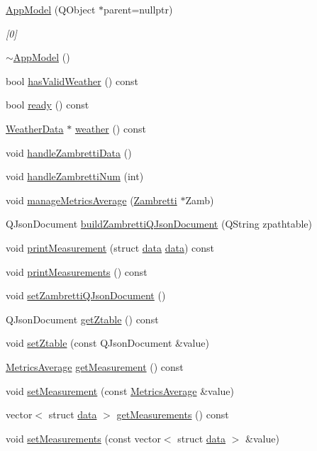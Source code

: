 \begin{DoxyCompactItemize}
\item 
\hyperlink{class_app_model_a14293f7293e1bcbfdb5499789f9e134b}{App\+Model} (Q\+Object $\ast$parent=nullptr)
\begin{DoxyCompactList}\small\item\em \mbox{[}0\mbox{]} \end{DoxyCompactList}\item 
\hyperlink{class_app_model_a67ab3004ccbe2822a8a0abb9fa96ace3}{$\sim$\+App\+Model} ()
\item 
bool \hyperlink{class_app_model_a6ec5b34a1839a7141979709418174ad1}{has\+Valid\+Weather} () const
\item 
bool \hyperlink{class_app_model_a3917fdc3dd8c97715991d9fd1a23abcc}{ready} () const
\item 
\hyperlink{class_weather_data}{Weather\+Data} $\ast$ \hyperlink{class_app_model_a70a5bec8e359e4edbd16611efa96cf32}{weather} () const
\item 
void \hyperlink{class_app_model_a99a784aac19e82ccc6c0dd0509b4ea04}{handle\+Zambretti\+Data} ()
\item 
void \hyperlink{class_app_model_a75d2b6e818885a77f1b1dd56fc3c9cd3}{handle\+Zambretti\+Num} (int)
\item 
void \hyperlink{class_app_model_a91f558862aad6b2509f03e49b549270e}{manage\+Metrics\+Average} (\hyperlink{class_zambretti}{Zambretti} $\ast$Zamb)
\item 
Q\+Json\+Document \hyperlink{class_app_model_a2e738230cd01012b529adadc3f7c4eae}{build\+Zambretti\+Q\+Json\+Document} (Q\+String zpathtable)
\item 
void \hyperlink{class_app_model_a2bb0474a4f5f73ca23f9f72c97912192}{print\+Measurement} (struct \hyperlink{structdata}{data} \hyperlink{structdata}{data}) const
\item 
void \hyperlink{class_app_model_ac60073d6c96f7471f7227be130033399}{print\+Measurements} () const
\item 
void \hyperlink{class_app_model_a18bdf8b2328b6d64e2315b5e8027f07e}{set\+Zambretti\+Q\+Json\+Document} ()
\item 
Q\+Json\+Document \hyperlink{class_app_model_a1e221ad7947cc08e85078416afc5a593}{get\+Ztable} () const
\item 
void \hyperlink{class_app_model_ad4f010e1e4244d90cd648c6806dcda4e}{set\+Ztable} (const Q\+Json\+Document \&value)
\item 
\hyperlink{class_metrics_average}{Metrics\+Average} \hyperlink{class_app_model_ac9dff9ffdd21a1749d2461c3d2587f6a}{get\+Measurement} () const
\item 
void \hyperlink{class_app_model_af8e28b32ab4d33c6f10bcab5d9c5b25c}{set\+Measurement} (const \hyperlink{class_metrics_average}{Metrics\+Average} \&value)
\item 
vector$<$ struct \hyperlink{structdata}{data} $>$ \hyperlink{class_app_model_aeb65a362d2a2875ed038dc1ae359a337}{get\+Measurements} () const
\item 
void \hyperlink{class_app_model_ad78b2a410448a33eb9913cebfa64d32d}{set\+Measurements} (const vector$<$ struct \hyperlink{structdata}{data} $>$ \&value)
\end{DoxyCompactItemize}
